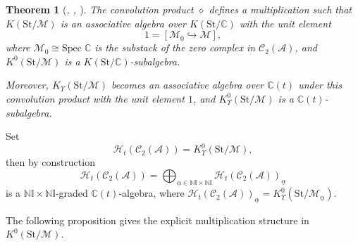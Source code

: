 \documentclass[12pt]{amsart}
\newtheorem{theorem}{Theorem}[section]
\theoremstyle{definition}
\numberwithin{equation}{section}
\begin{document}
\begin{theorem}[{\itshape\cite[Theorem 5.2]{Joyce07}, \cite[Theorem 4.3]{Bridgeland12}, \cite[Theorem 4.8, Corollary 4.9]{FLX24}}]\;

    The convolution product $ \diamond $ defines a multiplication such that $ K(\mathrm{St/\mathcal{M}}) $ is an associative algebra over $ K(\mathrm{St}/\mathbb{C}) $ with the unit element 
    \[ 1= [\mathcal{M}_0 \hookrightarrow \mathcal{M}],\]
    where $ \mathcal{M}_0 \cong \mathrm{Spec}\;\mathbb{C} $ is the substack of the zero complex in $ \mathcal{C}_2(\mathcal{A}) $, and $ K^0(\mathrm{St}/\mathcal{M})  $ is a $  K(\mathrm{St}/\mathbb{C}) $-subalgebra. 
    
    Moreover, $ K_{\Upsilon}(\mathrm{St}/\mathcal{M}) $ becomes an associative algebra over $ \mathbb{C}(t) $ under this convolution product with the unit element $ 1 $, and $ K^0_{\Upsilon}(\mathrm{St}/\mathcal{M}) $ is a $ \mathbb{C}(t) $-subalgebra. 
\end{theorem}

Set
\[
\mathcal{H}_t(\mathcal{C}_2(\mathcal{A})) =  K_{\Upsilon}^0(\mathrm{St}/\mathcal{M}),
\]
then by construction
\[
\mathcal{H}_t(\mathcal{C}_2(\mathcal{A})) =  \bigoplus_{\underline{\alpha}\in \mathbb{N}\mathbb{I}\times \mathbb{N}\mathbb{I}}\mathcal{H}_t(\mathcal{C}_2(\mathcal{A}))_{\underline{\alpha}}
\]
is a $ \mathbb{N}\mathbb{I}\times \mathbb{N}\mathbb{I} $-graded $ \mathbb{C}(t) $-algebra, where  $\mathcal{H}_t(\mathcal{C}_2(\mathcal{A}))_{\underline{\alpha}}=K_{\Upsilon}^0(\mathrm{St}/\mathcal{M}_{\underline{\alpha}})$.

The following proposition gives the explicit multiplication structure in $ K^0(\mathrm{St}/\mathcal{M}) $. 
\end{document}
